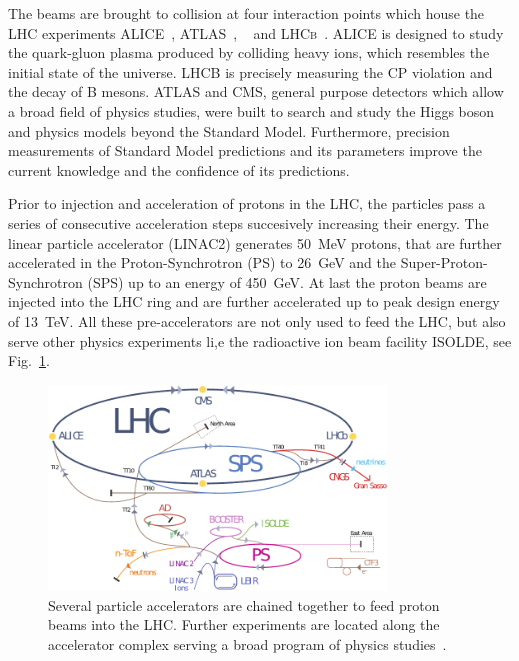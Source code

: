 The beams are brought to collision at four interaction points which house the
LHC experiments ALICE~\cite{ALICE}, ATLAS~\cite{ATLASa},
\CMS~\cite{Bayatian:922757,Ball:2007zza,Chatrchyan:2008aa} and
\textsc{LHCb}~\cite{LHCb}. ALICE is designed to study the quark-gluon plasma
produced by colliding heavy ions, which resembles the initial state of the
universe. LHCB is precisely measuring the CP violation and the decay of B
mesons. ATLAS and CMS, general purpose detectors which allow a broad field of
physics studies, were built to search and study the Higgs boson and physics
models beyond the Standard Model. Furthermore, precision measurements of
Standard Model predictions and its parameters improve the current knowledge and
the confidence of its predictions.

Prior to injection and acceleration of protons in the LHC, the particles pass a
series of consecutive acceleration steps succesively increasing their energy.
The linear particle accelerator (LINAC2) generates \SI{50}{\mega \electronvolt}
protons, that are further accelerated in the Proton-Synchrotron (PS) to
\SI{26}{\giga \electronvolt} and the Super-Proton-Synchrotron (SPS) up to an
energy of \SI{450}{\giga \electronvolt}. At last the proton beams are injected
into the LHC ring and are further accelerated up to peak design energy of
\SI{13}{\tera\electronvolt}. All these pre-accelerators are not only used to
feed the LHC, but also serve other physics experiments li,e the radioactive ion
beam facility ISOLDE, see Fig.~\ref{fig:lhc_complex}.

\begin{figure}[htbp]
    \centering
    \includegraphics[width=0.8\textwidth]{figures/cms_detector/lhc_accelerator_chain.pdf}
    \caption[\CERN accelerator complex]{Several particle accelerators are
        chained together to feed proton beams into the LHC. Further experiments are
        located along the accelerator complex serving a broad program of physics
        studies~\cite{LHC:COMPLEX}.}
    \label{fig:lhc_complex}
\end{figure}

